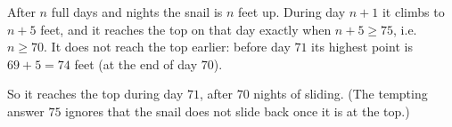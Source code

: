 After $n$ full days and nights the snail is $n$ feet up. During day $n+1$ it climbs to $n+5$ feet, and it reaches the top on that day exactly when $n+5\ge75$, i.e. $n\ge70$. It does not reach the top earlier: before day $71$ its highest point is $69+5=74$ feet (at the end of day $70$).

So it reaches the top during day $\boxed{71}$, after $70$ nights of sliding. (The tempting answer $75$ ignores that the snail does not slide back once it is at the top.)
